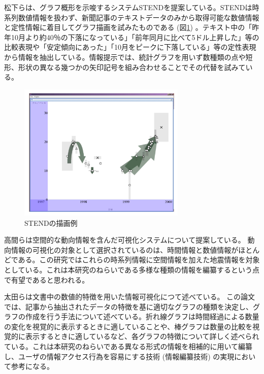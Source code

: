 \documentclass{matsushita-zemi}
\begin{document}
松下らは、グラフ概形を示唆するシステムSTENDを提案している\cite{STEND}。STENDは時系列数値情報を扱わず、新聞記事のテキストデータのみから取得可能な数値情報と定性情報に着目してグラフ描画を試みたものである (図\ref{STEND}) 。テキスト中の「昨年10月より約40％の下落になっている」「前年同月に比べて5ドル上昇した」等の比較表現や「安定傾向にあった」「10月をピークに下落している」等の定性表現から情報を抽出している。情報提示では、統計グラフを用いず数種類の点や短形、形状の異なる幾つかの矢印記号を組み合わせることでその代替を試みている。
\begin{figure}[tb]
  \begin{center}
   \includegraphics[width=8cm,bb=0 0 512 422]{STEND.PNG}
  \end{center}
 \caption{STENDの描画例}
 \label{STEND}
\end{figure}

高間らは空間的な動向情報を含んだ可視化システムについて提案している\cite{SpaceTrendInformation}。
動向情報の可視化の対象として選択されているのは、時間情報と数値情報がほとんどである。この研究ではこれらの時系列情報に空間情報を加えた地震情報を対象としている。これは本研究のねらいである多様な種類の情報を編纂するという点で有望であると思われる。


太田らは文書中の数値的特徴を用いた情報可視化につて述べている\cite{numerical_features}。
この論文では、記事から抽出されたデータの特徴を基に適切なグラフの種類を決定し、グラフの作成を行う手法について述べている。折れ線グラフは時間経過による数量の変化を視覚的に表示するときに適していることや、棒グラフは数量の比較を視覚的に表示するときに適しているなど、各グラフの特徴について詳しく述べられている。これは本研究のねらいである異なる形式の情報を相補的に用いて編纂し、ユーザの情報アクセス行為を容易にする技術 (情報編纂技術) の実現において参考になる。
\end{document}
